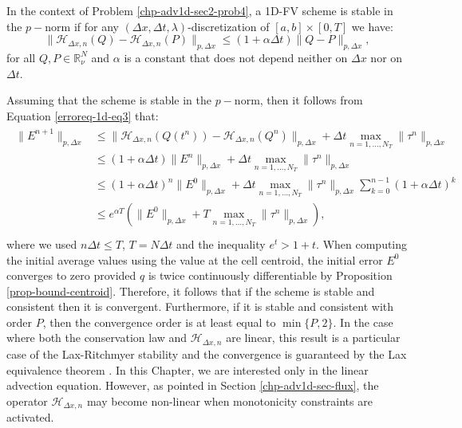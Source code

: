 \begin{definition}[Stability]
	In the context of Problem  \ref{chp-adv1d-sec2-prob4},
	a 1D-FV scheme is stable in the $p-$norm if for any $(\Delta x, \Delta t, \lambda)$-discretization of $[a,b]\times [0,T]$ we have:
	\begin{equation}
		\|\mathcal{H}_{\Delta x,n}(Q) - \mathcal{H}_{\Delta x,n}(P)\|_{p,\Delta x} \leq (1+\alpha \Delta t)  \|Q-P\|_{p,\Delta x},
	\end{equation}
	for all $Q, P \in \mathbb{R}^{N}_{\nu}$ and $\alpha$ is a constant
	that does not depend neither on $\Delta x$ nor on  $\Delta t$.
\end{definition}
Assuming that the scheme is stable in the $p-$norm, then it follows from Equation \eqref{erroreq-1d-eq3} that:
\begin{align}
	\label{chp-adv1d-sec2-erroreq}
	\begin{split}
		\|E^{n+1}\|_{p,\Delta x} 
		&\leq \|\mathcal{H}_{\Delta x,n}(Q(t^n)) - \mathcal{H}_{\Delta x,n}(Q^n)\|_{p,\Delta x} +  \Delta t \max_{n=1, \ldots, N_T}\|\tau^n\|_{p,\Delta x}\\
		&\leq (1+\alpha \Delta t)\|E^n\|_{p,\Delta x} +  \Delta t \max_{n=1, \ldots, N_T}\|\tau^n\|_{p,\Delta x}\\
		&\leq (1+\alpha \Delta t)^n\|E^0\|_{p,\Delta x} +  \Delta t \max_{n=1, \ldots, N_T}\|\tau^n\|_{p,\Delta x}
		\sum_{k=0}^{n-1} (1+\alpha \Delta t)^k\\
		&\leq e^{\alpha T}(\|E^0\|_{p,\Delta x} + T\max_{n=1, \ldots, N_T}\|\tau^n\|_{p,\Delta x}), \\
	\end{split}
\end{align}
where we used $n \Delta t\leq T $, $T=N\Delta t$ and the inequality $e^t> 1+t$.
When computing the initial average values using the value at the cell centroid, 
the initial error $E^0$ converges to zero provided $q$ is twice continuously differentiable
by Proposition \ref{prop-bound-centroid}.
Therefore, it follows that if the scheme is stable and consistent
then it is convergent. 
Furthermore, if it is stable and consistent with order $P$, then
the convergence order is at least equal to $\min\{{P,2}\}$.
In the case where both the conservation law and $\mathcal{H}_{\Delta x,n}$ are linear,
this result is a particular case of the Lax-Ritchmyer stability and the convergence
is guaranteed by the Lax equivalence theorem \citep{leveque:2002}.
In this Chapter, we are interested only in the linear advection equation.
However, as pointed in Section \ref{chp-adv1d-sec-flux}, the operator $\mathcal{H}_{\Delta x,n}$
may become non-linear when monotonicity constraints are activated.

